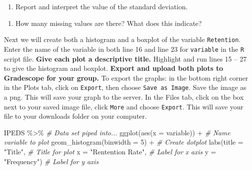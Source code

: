 \documentclass[
]{report}
\newenvironment{Shaded}{\begin{snugshade}}{\end{snugshade}}
\newcommand{\AttributeTok}[1]{\textcolor[rgb]{0.77,0.63,0.00}{#1}}
\newcommand{\CommentTok}[1]{\textcolor[rgb]{0.56,0.35,0.01}{\textit{#1}}}
\newcommand{\DecValTok}[1]{\textcolor[rgb]{0.00,0.00,0.81}{#1}}
\newcommand{\FunctionTok}[1]{\textcolor[rgb]{0.00,0.00,0.00}{#1}}
\newcommand{\NormalTok}[1]{#1}
\newcommand{\SpecialCharTok}[1]{\textcolor[rgb]{0.00,0.00,0.00}{#1}}
\newcommand{\StringTok}[1]{\textcolor[rgb]{0.31,0.60,0.02}{#1}}
\providecommand{\tightlist}{%
  \setlength{\itemsep}{0pt}\setlength{\parskip}{0pt}}
\begin{document}
\vspace{0.5in}

\begin{enumerate}
\def\labelenumi{\arabic{enumi}.}
\setcounter{enumi}{4}
\tightlist
\item
  Report and interpret the value of the standard deviation.
\end{enumerate}

\vspace{1in}

\begin{enumerate}
\def\labelenumi{\arabic{enumi}.}
\setcounter{enumi}{5}
\tightlist
\item
  How many missing values are there? What does this indicate?
\end{enumerate}

\vspace{0.8in}

Next we will create both a histogram and a boxplot of the variable \texttt{Retention}. Enter the name of the variable in both line 16 and line 23 for \texttt{variable} in the \texttt{R} script file. \textbf{Give each plot a descriptive title.} Highlight and run lines 15 -- 27 to give the histogram and boxplot. \textbf{Export and upload both plots to Gradescope for your group.} To export the graphs: in the bottom right corner in the Plots tab, click on \texttt{Export}, then choose \texttt{Save\ as\ Image}. Save the image as a png. This will save your graph to the server. In the Files tab, click on the box next to your saved image file, click \texttt{More} and choose \texttt{Export}. This will save your file to your downloads folder on your computer.

\begin{Shaded}
\begin{Highlighting}[]
\NormalTok{IPEDS }\SpecialCharTok{\%\textgreater{}\%} \CommentTok{\# Data set piped into...}
\FunctionTok{ggplot}\NormalTok{(}\FunctionTok{aes}\NormalTok{(}\AttributeTok{x =}\NormalTok{ variable)) }\SpecialCharTok{+}   \CommentTok{\# Name variable to plot}
  \FunctionTok{geom\_histogram}\NormalTok{(}\AttributeTok{binwidth =} \DecValTok{5}\NormalTok{) }\SpecialCharTok{+}  \CommentTok{\# Create dotplot}
  \FunctionTok{labs}\NormalTok{(}\AttributeTok{title =} \StringTok{"Title"}\NormalTok{, }\CommentTok{\# Title for plot}
       \AttributeTok{x =} \StringTok{"Rentention Rate"}\NormalTok{, }\CommentTok{\# Label for x axis}
       \AttributeTok{y =} \StringTok{"Frequency"}\NormalTok{) }\CommentTok{\# Label for y axis}
\end{Highlighting}
\end{Shaded}
\end{document}
